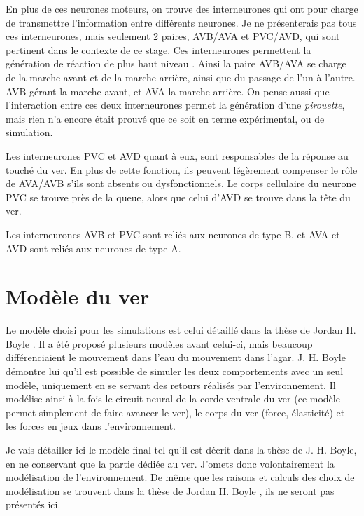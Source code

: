 En plus de ces neurones moteurs, on trouve des interneurones qui ont pour
charge de transmettre l'information entre différents neurones. Je ne
présenterais pas tous ces interneurones, mais seulement 2 paires, AVB/AVA et
PVC/AVD, qui sont pertinent dans le contexte de ce stage. Ces interneurones
permettent la génération de réaction de plus haut niveau
\cite{Boyle2009,White1986}.  Ainsi la paire AVB/AVA se charge de la marche
avant et de la marche arrière, ainsi que du passage de l'un à l'autre. AVB gérant
la marche avant, et AVA la marche arrière. On pense aussi que l'interaction
entre ces deux interneurones permet la génération d'une \textit{pirouette},
mais rien n'a encore était prouvé que ce soit en terme expérimental, ou de
simulation.

Les interneurones PVC et AVD quant à eux, sont responsables de la réponse au
touché du ver. En plus de cette fonction, ils peuvent légèrement compenser le
rôle de AVA/AVB s'ils sont absents ou dysfonctionnels. Le corps cellulaire du
neurone PVC se trouve près de la queue, alors que celui d'AVD se trouve dans la
tête du ver.

Les interneurones AVB et PVC sont reliés aux neurones de type B, et AVA et AVD
sont reliés aux neurones de type A.




\section{Modèle du ver} %
\label{sec:Modèle du ver}

Le modèle choisi pour les simulations est celui détaillé dans la thèse de
Jordan H. Boyle \cite{Boyle2009}. Il a été proposé plusieurs modèles avant
celui-ci, mais beaucoup différenciaient le mouvement dans l'eau du mouvement
dans l'agar. J. H. Boyle démontre lui qu'il est possible de simuler les deux
comportements avec un seul modèle, uniquement en se servant des retours
réalisés par l'environnement. Il modélise ainsi à la fois le circuit neural de
la corde ventrale du ver (ce modèle permet simplement de faire avancer le ver),
le corps du ver (force, élasticité) et les forces en jeux dans l'environnement.

Je vais détailler ici le modèle final tel qu'il est décrit dans la thèse de J.
H. Boyle, en ne conservant que la partie dédiée au ver. J'omets donc
volontairement la modélisation de l'environnement. De même que les raisons et
calculs des choix de modélisation se trouvent dans la thèse de Jordan H. Boyle
\cite{Boyle2009}, ils ne seront pas présentés ici.\\

